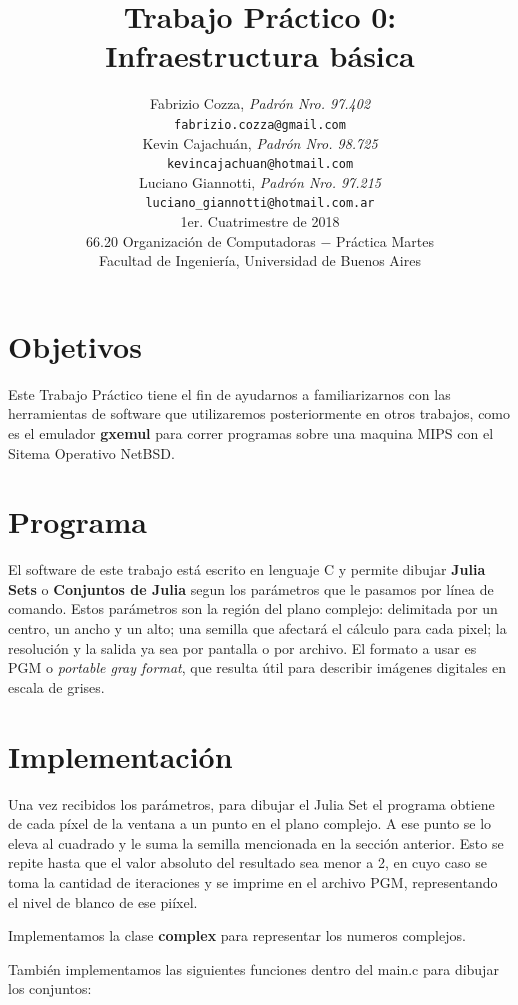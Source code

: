 \documentclass[a4paper,10pt]{article}
\title{		\textbf{Trabajo Pr\'{a}ctico 0: \\
			Infraestructura b\'{a}sica
			}}
\author{	Fabrizio Cozza, \textit{Padr\'{o}n Nro. 97.402}                     \\
            \texttt{ fabrizio.cozza@gmail.com }                                              \\[2.5ex]
            Kevin Cajachu\'{a}n, \textit{Padr\'{o}n Nro. 98.725}                     \\
            \texttt{ kevincajachuan@hotmail.com }                                              \\[2.5ex]
            Luciano Giannotti, \textit{Padr\'{o}n Nro. 97.215}                     \\
            \texttt{luciano\_giannotti@hotmail.com.ar}                                              \\[3.5ex]
	 \newline
            \normalsize{1er. Cuatrimestre de 2018}                                      \\
            \normalsize{66.20 Organizaci\'{o}n de Computadoras  $-$ Pr\'{a}ctica Martes}  \\
            \normalsize{Facultad de Ingenier\'{i}a, Universidad de Buenos Aires}            \\
       }
\date{}
\begin{document}
\maketitle
\thispagestyle{empty}   %
\newpage

\section{Objetivos}

Este Trabajo Pr\'{a}ctico tiene el fin de ayudarnos a familiarizarnos con las herramientas de software que utilizaremos posteriormente en otros trabajos, como es el emulador \textbf{gxemul} para correr programas sobre una maquina MIPS con el Sitema Operativo NetBSD.


\section{Programa}

El software de este trabajo est\'{a} escrito en lenguaje C y permite dibujar \textbf{Julia Sets} o \textbf{Conjuntos de Julia} segun los par\'{a}metros que le pasamos por l\'{i}nea de comando.
Estos par\'{a}metros son la regi\'{o}n del plano complejo: delimitada por un centro, un ancho y un alto; una semilla que afectar\'{a} el c\'{a}lculo para cada pixel; la resoluci\'{o}n y la salida ya sea por pantalla o por archivo.
El formato a usar es  PGM o \textit{portable gray format}, que resulta \'{u}til para describir im\'{a}genes digitales en escala de grises.


\section{Implementaci\'{o}n}

Una vez recibidos los par\'{a}metros, para dibujar el Julia Set el programa obtiene de cada p\'{i}xel de la ventana a un punto en el plano complejo.
A ese punto se lo eleva al cuadrado y le suma la semilla mencionada en la secci\'{o}n anterior. Esto se repite hasta que el valor absoluto del resultado sea menor a 2, en cuyo caso se toma la cantidad de iteraciones y se imprime en el archivo PGM, representando el nivel de blanco de ese pi\'{i}xel.

Implementamos la clase \textbf{complex} para representar los numeros complejos.

Tambi\'{e}n implementamos las siguientes funciones dentro del main.c para dibujar los conjuntos:
\end{document}
